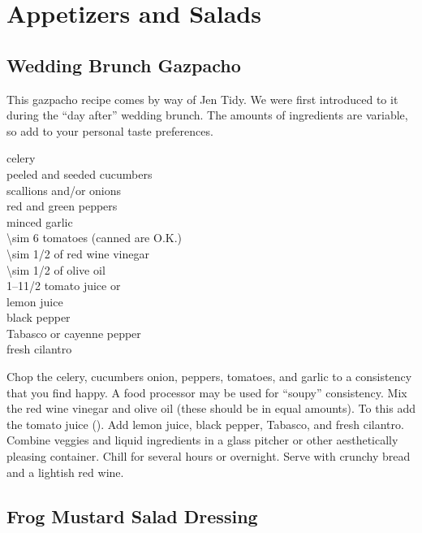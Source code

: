 \chapter{Appetizers and Salads}

\section{Wedding Brunch Gazpacho}

\begin{open}
  This gazpacho recipe comes by way of Jen Tidy.  We were first
  introduced to it during the ``day after'' wedding brunch.  The amounts of
  ingredients are variable, so add to your personal taste preferences.
\end{open}
\begin{ingredients}
  celery \\
  peeled and seeded cucumbers \\
  scallions and/or onions \\
  red and green peppers \\
  minced garlic \\
  \num{\sim 6} tomatoes (canned are O.K.) \\
  \SI{\sim 1/2}{\cup} of red wine vinegar \\
  \SI{\sim 1/2}{\cup} of olive oil \\
  \numrange{1}{1}\SI{1/2}{\cup} tomato juice or  \\
  lemon juice \\
  black pepper \\
  Tabasco or cayenne pepper \\
  fresh cilantro
\end{ingredients}
Chop the celery, cucumbers onion, peppers, tomatoes, and garlic to a
consistency that you find happy.  A food processor may be used for ``soupy''
consistency.  Mix the red wine vinegar and olive oil (these should be in equal
amounts).  To this add the tomato juice ().  Add lemon juice, black
pepper, Tabasco, and fresh cilantro.  Combine veggies and liquid ingredients
in a glass pitcher or other aesthetically pleasing container.  Chill for
several hours or overnight.  Serve with crunchy bread and a lightish red wine.

\section{Frog Mustard Salad Dressing}

